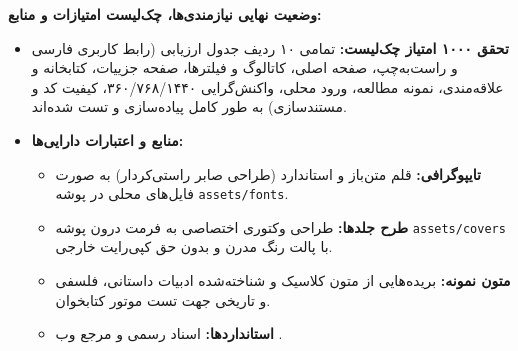 \documentclass[12pt]{exam}
\begin{document}
\begin{questions}
\question
\textbf{وضعیت نهایی نیازمندی‌ها، چک‌لیست امتیازات و منابع:}
\begin{itemize}
    \item \textbf{تحقق ۱۰۰۰ امتیاز چک‌لیست:}
    تمامی ۱۰ ردیف جدول ارزیابی (رابط کاربری فارسی و راست‌به‌چپ، صفحه اصلی، کاتالوگ و فیلترها، صفحه جزییات، کتابخانه و علاقه‌مندی، نمونه مطالعه، ورود محلی، واکنش‌گرایی ۳۶۰/۷۶۸/۱۴۴۰، کیفیت کد و مستندسازی) به طور کامل پیاده‌سازی و تست شده‌اند.
    \item \textbf{منابع و اعتبارات دارایی‌ها:}
    \begin{itemize}
        \item \textbf{تایپوگرافی:} قلم متن‌باز و استاندارد  (طراحی صابر راستی‌کردار) به صورت فایل‌های محلی در پوشه \texttt{assets/fonts}.
        \item \textbf{طرح جلدها:} طراحی وکتوری اختصاصی به فرمت  درون پوشه \texttt{assets/covers} با پالت رنگ مدرن و بدون حق کپی‌رایت خارجی.
        \item \textbf{متون نمونه:} بریده‌هایی از متون کلاسیک و شناخته‌شده ادبیات داستانی، فلسفی و تاریخی جهت تست موتور کتابخوان.
        \item \textbf{استانداردها:} اسناد رسمی  و مرجع وب .
    \end{itemize}
\end{itemize}

\end{questions}
\end{document}
